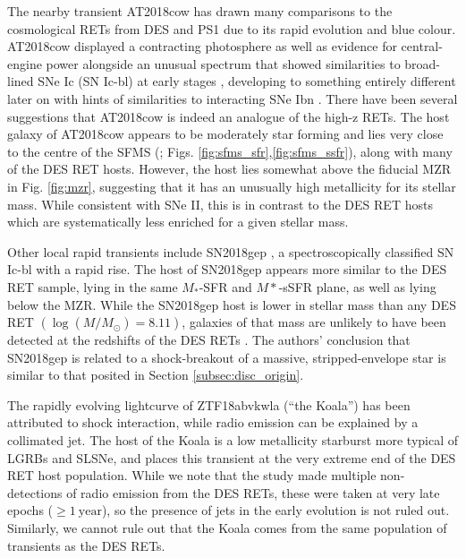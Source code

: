 \documentclass[fleqn,usenatbib,]{mnras}
\begin{document}
The nearby transient AT2018cow has drawn many comparisons to the cosmological RETs from DES and PS1 \citep[e.g.][]{Perley2019,Margutti2019,Fox2019,Mohan2020} due to its rapid evolution and blue colour. AT2018cow displayed a contracting photosphere as well as evidence for central-engine power alongside an unusual spectrum that showed similarities to broad-lined SNe Ic (SN Ic-bl) at early stages \citep[e.g.][]{Xu2018,Izzo2018} , developing to something entirely different later on \citep{Perley2019} with hints of similarities to interacting SNe Ibn \citep{Fox2019}. There have been several suggestions that AT2018cow is indeed an analogue of the high-z RETs. The host galaxy of AT2018cow appears to be moderately star forming and lies very close to the centre of the SFMS (\citealt{Lyman2020}; Figs. \ref{fig:sfms_sfr},\ref{fig:sfms_ssfr}), along with many of the DES RET hosts. However, the host lies somewhat above the fiducial MZR in Fig. \ref{fig:mzr}, suggesting that it has an unusually high metallicity for its stellar mass. While consistent with SNe II, this is in contrast to the DES RET hosts which are systematically less enriched for a given stellar mass. 

Other local rapid transients include SN2018gep \citep{Ho2019}, a spectroscopically classified SN Ic-bl with a rapid rise. The host of SN2018gep appears more similar to the DES RET sample, lying in the same $M_*$-SFR and $M*$-sSFR plane, as well as lying below the MZR. While the SN2018gep host is lower in stellar mass than any DES RET $\left(\log \left(M/M_{\odot}\right) =8.11\right)$, galaxies of that mass are unlikely to have been detected at the redshifts of the DES RETs \citep{Wiseman2020}. The authors' conclusion that SN2018gep is related to a shock-breakout of a massive, stripped-envelope star is similar to that posited in Section \ref{subsec:disc_origin}. 

The rapidly evolving lightcurve of ZTF18abvkwla (``the Koala'') has been attributed to shock interaction, while radio emission can be explained by a collimated jet. The host of the Koala is a low metallicity starburst more typical of LGRBs and SLSNe, and places this transient at the very extreme end of the DES RET host population. While we note that the \citet{Ho2020} study made multiple non-detections of radio emission from the DES RETs, these were taken at very late epochs ($\geq 1~\mathrm{year}$), so the presence of jets in the early evolution is not ruled out. Similarly, we cannot rule out that the Koala comes from the same population of transients as the DES RETs.
\end{document}
